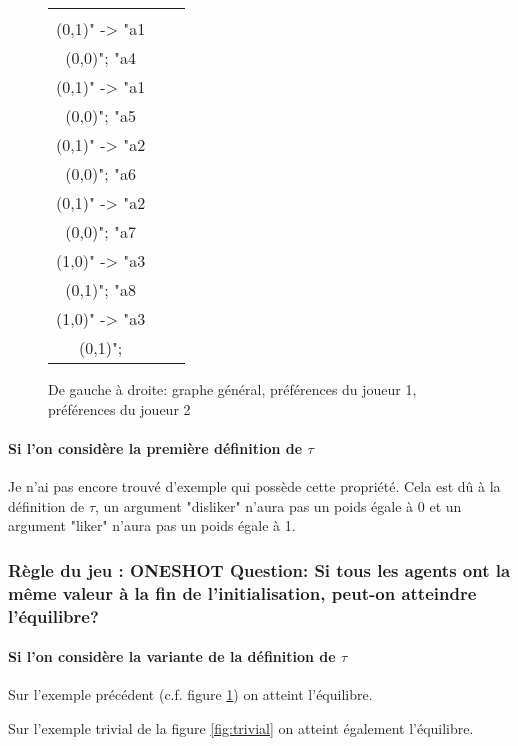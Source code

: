 \documentclass[12pt]{article}
\theoremstyle{defi}
\theoremstyle{not}
\theoremstyle{prob}
\begin{document}
\begin{figure}
\begin{tabular}{ccc}
\begin{tikzpicture}[>=stealth]
{  "a3\\ (0,1)" -> "a1\\ (0,0)";
  "a4\\ (0,1)" -> "a1\\ (0,0)";
  "a5\\ (0,1)" -> "a2\\ (0,0)";
  "a6\\ (0,1)" -> "a2\\ (0,0)";
  "a7\\ (1,0)" -> "a3\\ (0,1)";
  "a8\\ (1,0)" -> "a3\\ (0,1)";
  };
  \end{tikzpicture} \\
\end{tabular}
\color{blue}
\caption{De gauche à droite: graphe général, préférences du joueur 1, préférences du joueur 2}
\label{fig:dif_pref}
\end{figure}

\paragraph{Si l'on considère la première définition de $\tau$\\}
Je n'ai pas encore trouvé d'exemple qui possède cette propriété.
Cela est dû à la définition de $\tau$, un argument "disliker" n'aura pas un poids égale à 0 et un argument "liker" n'aura pas un poids égale à 1.


\subsubsection{Règle du jeu : ONESHOT Question: Si tous les agents ont la même valeur à la fin de l'initialisation, peut-on atteindre l'équilibre?}

\paragraph{Si l'on considère la variante de la définition de $\tau$\\}

Sur l'exemple précédent (c.f. figure \ref{fig:dif_pref}) on atteint l'équilibre.

Sur l'exemple trivial de la figure \ref{fig:trivial} on atteint également l'équilibre.
\end{document}
